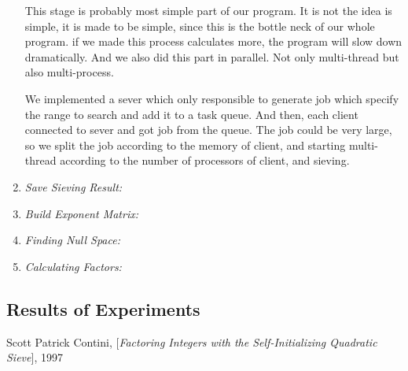 \documentclass[12pt]{article} %
\begin{document}
\begin{enumerate}
This stage is probably most simple part of our program. It is not the idea is simple, it is made to be simple, since this is the bottle neck of our whole program. if we made this process calculates more, the program will slow down dramatically. And we also did this part in parallel. Not only multi-thread but also multi-process. 

We implemented a sever which only responsible to generate job which specify the range to search and add it to a task queue. And then, each client connected to sever and got job from the queue. The job could be very large, so we split the job according to the memory of client, and starting multi-thread according to the number of processors of client, and sieving.

\item \textit{Save Sieving Result:}
\item \textit{Build Exponent Matrix:}
\item \textit{Finding Null Space:}
\item \textit{Calculating Factors:}

\end{enumerate}

\subsection {Results of Experiments}

\pagebreak
\begin{thebibliography}{99}

 Scott Patrick Contini, [\textit{Factoring Integers with the Self-Initializing Quadratic Sieve}], 1997

\end{thebibliography}
\end{document}
